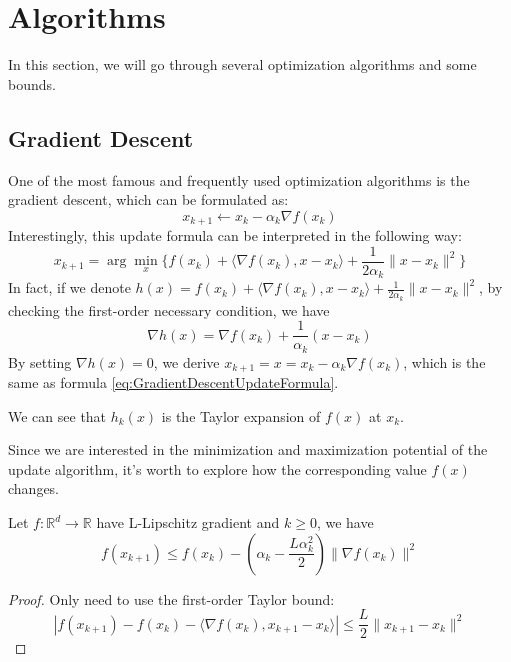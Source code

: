 \chapter{Algorithms}

In this section, we will go through several optimization algorithms and some bounds.

\section{Gradient Descent}
One of the most famous and frequently used optimization algorithms is the gradient descent, which can be formulated as:
\begin{equation}\label{eq:GradientDescentUpdateFormula}
    x_{k+1} \leftarrow x_k - \alpha_k\nabla f(x_k)
\end{equation}
Interestingly, this update formula can be interpreted in the following way:
\begin{equation*}
    x_{k+1} = \arg\min_x \{ f(x_k) + \langle \nabla f(x_k), x-x_k \rangle + \frac{1}{2\alpha_k}\|x-x_k\|^2 \}
\end{equation*}
In fact, if we denote $h(x) = f(x_k) + \langle \nabla f(x_k), x-x_k \rangle + \frac{1}{2\alpha_k}\|x-x_k\|^2$, by checking the first-order necessary condition, we have 
\begin{equation*}
    \nabla h(x) = \nabla f(x_k) + \frac{1}{\alpha_k}(x - x_k)
\end{equation*}
By setting $\nabla h(x) = 0$, we derive $x_{k+1} = x = x_k - \alpha_k\nabla f(x_k)$, which is the same as formula \ref{eq:GradientDescentUpdateFormula}.

\begin{note}
    We can see that $h_k(x)$ is the Taylor expansion of $f(x)$ at $x_k$.
\end{note}

Since we are interested in the minimization and maximization potential of the update algorithm, it's worth to explore how the corresponding value $f(x)$ changes. 
\begin{lemma}\label{lemma:DescentLemma}
    Let $f: \mathbb{R}^d \rightarrow \mathbb{R}$ have L-Lipschitz gradient and $k \geq 0$, we have
    \begin{equation*}
        f(x_{k+1}) \leq f(x_k) - (\alpha_k - \frac{L\alpha_k^2}{2}) \| \nabla f(x_k) \|^2
    \end{equation*}
\end{lemma}
\begin{proof}
    Only need to use the first-order Taylor bound:
    \begin{equation*}
        | f(x_{k+1}) - f(x_k) - \langle \nabla f(x_k), x_{k+1} - x_k \rangle | \leq \frac{L}{2}\|x_{k+1} - x_k\|^2
    \end{equation*}
\end{proof}

